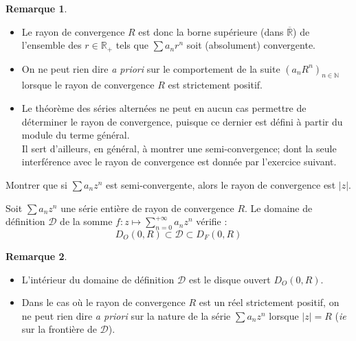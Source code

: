 \documentclass[french]{article}
\newcommand{\N}{\mathbb{N}}
\newcommand{\R}{\mathbb{R}}
\theoremstyle{plain}
\theoremstyle{definition}
\newtheorem*{rmq}{Remarque}
\theoremstyle{remark}
\begin{document}
\begin{rmq}%
	\begin{itemize}
		\item Le rayon de convergence $R$ est donc la borne supérieure (dans $\overline{\R}$) de l'ensemble des $r\in\R_+$ tels que $\displaystyle\sum a_nr^n$ soit (absolument) convergente.
		\item On ne peut rien dire \textit{a priori} sur le comportement de la suite $(a_nR^n)_{n\in\N}$ lorsque le rayon de convergence $R$ est strictement positif.
		\item Le théorème des séries alternées ne peut en aucun cas permettre de déterminer le rayon de convergence, puisque ce dernier est défini à partir du module du terme général. \\
		Il sert d'ailleurs, en général, à montrer une semi-convergence; dont la seule interférence avec le rayon de convergence est donnée par l'exercice suivant.
	\end{itemize}
\end{rmq}

\begin{exo}
	Montrer que si $\displaystyle\sum a_nz^n$ est semi-convergente, alors le rayon de convergence est $\lvert z\rvert$.
\end{exo}

\begin{prop}%
	Soit $\displaystyle\sum a_nz^n$ une série entière de rayon de convergence $R$. Le domaine de définition $\mathcal{D}$ de la somme $f:z\mapsto\displaystyle\sum_{n=0}^{+\infty}a_nz^n$ vérifie : $$D_O(0,R)\subset\mathcal{D}\subset D_F(0,R)$$
\end{prop}

\begin{rmq}%
	\begin{itemize}
		\item L'intérieur du domaine de définition $\mathcal{D}$ est le disque ouvert $D_O(0,R)$.
		\item Dans le cas où le rayon de convergence $R$ est un réel strictement positif, on ne peut rien dire \textit{a priori} sur la nature de la série $\displaystyle\sum a_nz^n$ lorsque $\lvert z\rvert=R$ (\textit{ie} sur la frontière de $\mathcal{D}$).
	\end{itemize}
\end{rmq}
\end{document}
